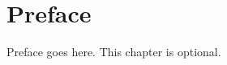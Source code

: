 \chapter*{Preface}

Preface goes here. This chapter is optional.

\begin{flushright}
{\makeatletter\itshape
    \@firstname\ \@lastname \\
    \@defencedate
\makeatother}
\end{flushright}

